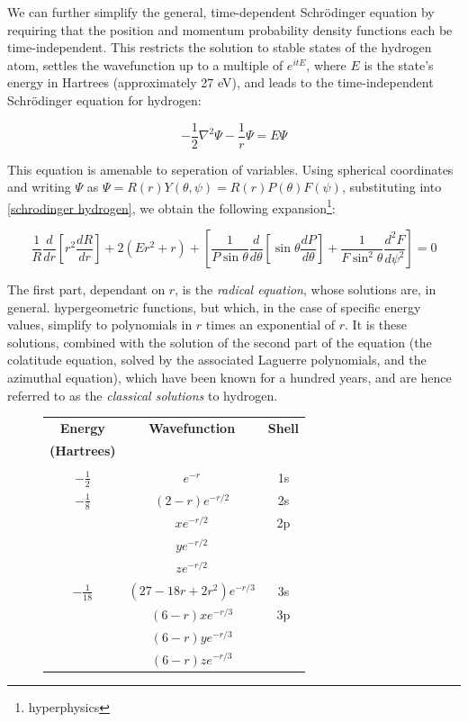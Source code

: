 \documentclass{article}
\begin{document}
We can further simplify the general, time-dependent Schr\"odinger equation
by requiring that the position and momentum probability density functions
each be time-independent.  This restricts the solution to stable states
of the hydrogen atom, settles the wavefunction up to a multiple of $e^{itE}$,
where $E$ is the state's energy in Hartrees (approximately 27 eV),
and leads to the time-independent Schr\"odinger equation for hydrogen:

\begin{equation}
\label{schrodinger hydrogen}
-\frac{1}{2}\nabla^2 \Psi - \frac{1}{r}\Psi = E \Psi
\end{equation}

This equation is amenable to seperation of variables.
Using spherical coordinates and writing $\Psi$ as $\Psi=R(r)Y(\theta, \psi) = R(r)P(\theta)F(\psi)$,
substituting into \eqref{schrodinger hydrogen}, we obtain the following expansion\footnote{hyperphysics}:

\begin{equation*}
\frac{1}{R} \frac{d}{dr}\left[ r^2 \frac{dR}{dr}\right] + 2(Er^2 + r)
+ \left[\frac{1}{P\sin\theta} \frac{d}{d\theta}\left[\sin\theta\frac{dP}{d\theta}\right]+\frac{1}{F\sin^2\theta}\frac{d^2 F}{d\psi^2}\right] = 0
\end{equation*}

The first part, dependant on $r$, is the {\it radical equation}, whose solutions are, in general.
hypergeometric functions, but which, in the case of specific energy values,
simplify to polynomials in $r$
times an exponential of $r$.  It is these solutions, combined with the solution
of the second part of the equation (the colatitude equation, solved by the associated Laguerre polynomials,
and the azimuthal equation), which have been known for a hundred years, and are
hence referred to as the {\it classical solutions} to hydrogen.

\begin{figure}
\begin{center}
\begin{tabular}{ccc}
{\bf Energy}		& {\bf Wavefunction}		& {\bf Shell} \\
{\bf (Hartrees)}	& & \\
\\
$-\frac{1}{2}$		& $e^{-r}$			& 1s \\
$-\frac{1}{8}$		& $(2-r)e^{-r/2}$		& 2s \\
			& $xe^{-r/2}$			& 2p \\
			& $ye^{-r/2}$			\\
			& $ze^{-r/2}$			\\
$-\frac{1}{18}$		& $(27-18r+2r^2)e^{-r/3}$	& 3s \\
			& $(6-r)xe^{-r/3}$		& 3p \\
			& $(6-r)ye^{-r/3}$		\\
			& $(6-r)ze^{-r/3}$		\\
\end{tabular}
\end{center}
\end{figure}
\end{document}
